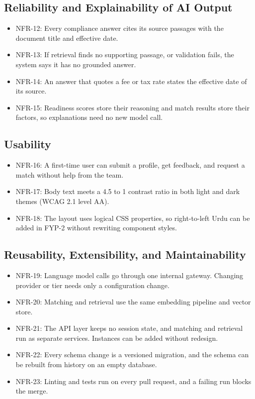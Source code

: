 \documentclass{FastFyp}
\begin{document}
\subsection{Reliability and Explainability of AI Output}
\begin{itemize}
    \item NFR-12: Every compliance answer cites its source passages with the document title and effective date.
    \item NFR-13: If retrieval finds no supporting passage, or validation fails, the system says it has no grounded answer.
    \item NFR-14: An answer that quotes a fee or tax rate states the effective date of its source.
    \item NFR-15: Readiness scores store their reasoning and match results store their factors, so explanations need no new model call.
\end{itemize}

\subsection{Usability}
\begin{itemize}
    \item NFR-16: A first-time user can submit a profile, get feedback, and request a match without help from the team.
    \item NFR-17: Body text meets a 4.5 to 1 contrast ratio in both light and dark themes (WCAG 2.1 level AA).
    \item NFR-18: The layout uses logical CSS properties, so right-to-left Urdu can be added in FYP-2 without rewriting component styles.
\end{itemize}

\subsection{Reusability, Extensibility, and Maintainability}
\begin{itemize}
    \item NFR-19: Language model calls go through one internal gateway. Changing provider or tier needs only a configuration change.
    \item NFR-20: Matching and retrieval use the same embedding pipeline and vector store.
    \item NFR-21: The API layer keeps no session state, and matching and retrieval run as separate services. Instances can be added without redesign.
    \item NFR-22: Every schema change is a versioned migration, and the schema can be rebuilt from history on an empty database.
    \item NFR-23: Linting and tests run on every pull request, and a failing run blocks the merge.
\end{itemize}
\end{document}

